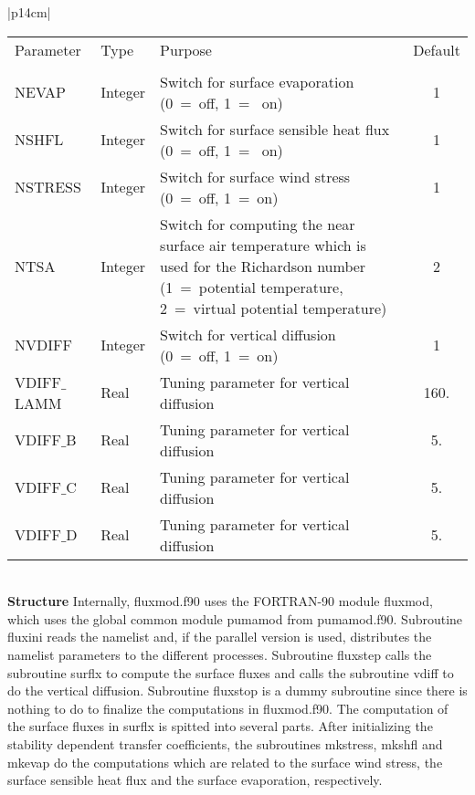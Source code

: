 \begin{center}
\begin{tabular}{|p{14cm}|}
\begin{center}
\begin{tabular}{l l p{7cm} c}  %
Parameter & Type & Purpose & Default \\
&&&\\
NEVAP & Integer & Switch for surface evaporation (0~=~off, 1~=~ on) & 1 \\
NSHFL & Integer &Switch for surface sensible heat flux (0~=~off, 1~=~ on) & 1 \\
NSTRESS & Integer & Switch for surface wind stress (0~=~off, 1~=~on) & 1 \\
NTSA & Integer & Switch for computing the near surface air temperature which is used for the
Richardson number (1~=~potential temperature, 2~=~virtual potential temperature)& 2 \\
NVDIFF & Integer & Switch for vertical diffusion (0~=~off, 1~=~on) & 1 \\
VDIFF$\_$LAMM & Real & Tuning parameter for vertical diffusion & 160. \\
VDIFF$\_$B & Real &Tuning parameter for vertical diffusion & 5. \\
VDIFF$\_$C & Real &Tuning parameter for vertical diffusion & 5. \\
VDIFF$\_$D & Real &Tuning parameter for vertical diffusion & 5. \\
\end{tabular} 
\end{center}
\vspace{3mm} \\
\hline
\vspace{2mm} {\bf Structure} Internally, {\module fluxmod.f90} uses the FORTRAN-90
module {\modu fluxmod}, which uses the global common module {\modu pumamod} from
{\module pumamod.f90}. Subroutine {\sub fluxini} reads the namelist and, if the parallel
version
is used,  distributes the namelist parameters to the different processes. Subroutine {\sub
fluxstep}
calls the subroutine {\sub surflx} to compute the surface fluxes and calls the subroutine {\sub
vdiff} to do the vertical diffusion. Subroutine {\sub fluxstop} is a dummy subroutine since there
is nothing to do to finalize the computations in {\module fluxmod.f90}. The computation of the
surface fluxes in {\sub surflx} is spitted into several parts. After initializing the stability
dependent transfer coefficients, the subroutines {\sub mkstress}, {\sub mkshfl} and {\sub
mkevap} do the computations which are related to the surface wind stress, the surface sensible
heat flux and the surface evaporation, respectively. \vspace{3mm} \\
\hline
\end{tabular}
\end{center}
\newpage

